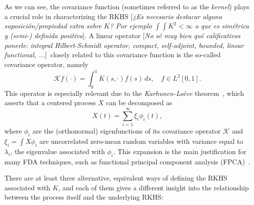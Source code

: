 \documentclass[ba]{imsart}
\numberwithin{equation}{section}
\theoremstyle{plain}
\newcommand\incomment[1]{\color{red}[\textit{#1}]\color{black}}
\begin{document}
As we can see, the covariance function (sometimes referred to as the \textit{kernel}) plays a crucial role in characterizing the RKHS \incomment{¿Es necesario destacar alguna suposición/propiedad extra sobre \(K\)? Por ejemplo \(\int\int K^2 <\infty\) o que es simétrica y (semi-) definida positiva}. A linear operator \incomment{No sé muy bien qué calificativos ponerle: integral Hilbert-Schmidt operator, compact, self-adjoint, bounded, linear functional, ...}\ closely related to this covariance function is the so-called covariance operator, namely
\[
\mathcal Kf(\cdot) = \int_0^1 K(s, \cdot)f(s)\, ds, \quad f \in L^2[0, 1].
\]
This operator is especially relevant due to the \textit{Karhunen-Loève} theorem~\cite[e.g.][Th.~1.5]{bosq2000linear}, which asserts that a centered process \(X\) can be decomposed as
\begin{equation}\label{eq:karhunen-loeve}
X(t) = \sum_{i=1}^\infty \xi_i \phi_i(t),
\end{equation}
where \(\phi_i\) are the (orthonormal) eigenfunctions of its covariance operator \(\mathcal K\) and \(\xi_i = \int X\phi_i\) are uncorrelated zero-mean random variables with variance equal to \(\lambda_i\), the eigenvalue associated with \(\phi_i\). This expansion is the main justification for many FDA techniques, such as functional principal component analysis (FPCA)~\cite[see for example][Ch.~8]{ramsay2005functional}.

There are at least three alternative, equivalent ways of defining the RKHS associated with \(K\), and each of them gives a different insight into the relationship between the process itself and the underlying RKHS:
\end{document}
